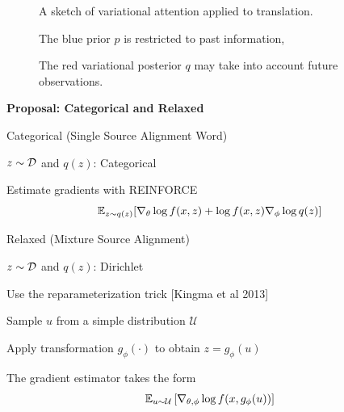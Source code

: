 \documentclass[aspectratio=169]{beamer}
\let\tempone\itemize
\let\temptwo\enditemize
\renewenvironment{itemize}{\tempone\addtolength{\itemsep}{0.5\baselineskip}}{\temptwo}
\newcommand{\thetitle}[1]{{\begin{center}\textbf{{#1}}\end{center}}}
\begin{document}
\begin{frame}
\begin{figure}


  A sketch of variational attention applied to translation.
  \begin{itemize}
  \item  The blue prior $p$ is restricted to past information,
  \item  The red variational posterior $q$ may take into account future observations.
  \end{itemize}
\end{figure}
\end{frame}


\begin{frame}\thetitle{Proposal: Categorical and Relaxed}
\begin{itemize}
    \item Categorical (Single Source Alignment Word)
    \begin{itemize}
        \item $z\sim\mathcal{D}$ and $q(z)$: Categorical
        \item Estimate gradients with REINFORCE
        \[ \mathbb{E}_{z \sim q(z)} [\nabla_\theta\log f(x,z) + \log f(x,z)\nabla_\phi \log q(z) ] \]
    \end{itemize}
    \pause

    \item Relaxed (Mixture Source Alignment)
    \begin{itemize}
        \item $z\sim\mathcal{D}$ and $q(z)$: Dirichlet
        \item Use the reparameterization trick {\small[Kingma et al 2013]}
            \begin{itemize}
            \item Sample $u$ from a simple distribution $\mathcal{U}$
            \item Apply transformation $g_{\phi}(\cdot)$ to obtain $z=g_{\phi}(u)$
            \end{itemize}
        \item The gradient estimator takes the form
            \[ \mathbb{E}_{u \sim \mathcal{U}} \left[\nabla_{\theta,\phi} \log f(x,g_\phi(u))\right ]\]
    \end{itemize}
\end{itemize}
\end{frame}
\end{document}
